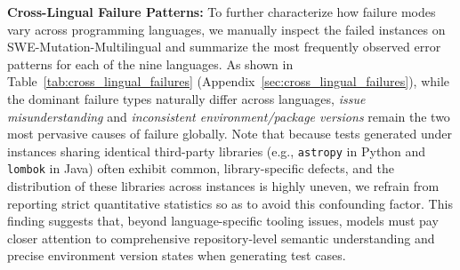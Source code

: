 \documentclass[11pt]{article}
\begin{document}
\textbf{Cross-Lingual Failure Patterns:} To further characterize how failure modes vary across programming languages, we manually inspect the failed instances on SWE-Mutation-Multilingual and summarize the most frequently observed error patterns for each of the nine languages. As shown in Table~\ref{tab:cross_lingual_failures} (Appendix~\ref{sec:cross_lingual_failures}), while the dominant failure types naturally differ across languages, \emph{issue misunderstanding} and \emph{inconsistent environment/package versions} remain the two most pervasive causes of failure globally. Note that because tests generated under instances sharing identical third-party libraries (e.g., \texttt{astropy} in Python and \texttt{lombok} in Java) often exhibit common, library-specific defects, and the distribution of these libraries across instances is highly uneven, we refrain from reporting strict quantitative statistics so as to avoid this confounding factor. This finding suggests that, beyond language-specific tooling issues, models must pay closer attention to comprehensive repository-level semantic understanding and precise environment version states when generating test cases.



\end{document}
